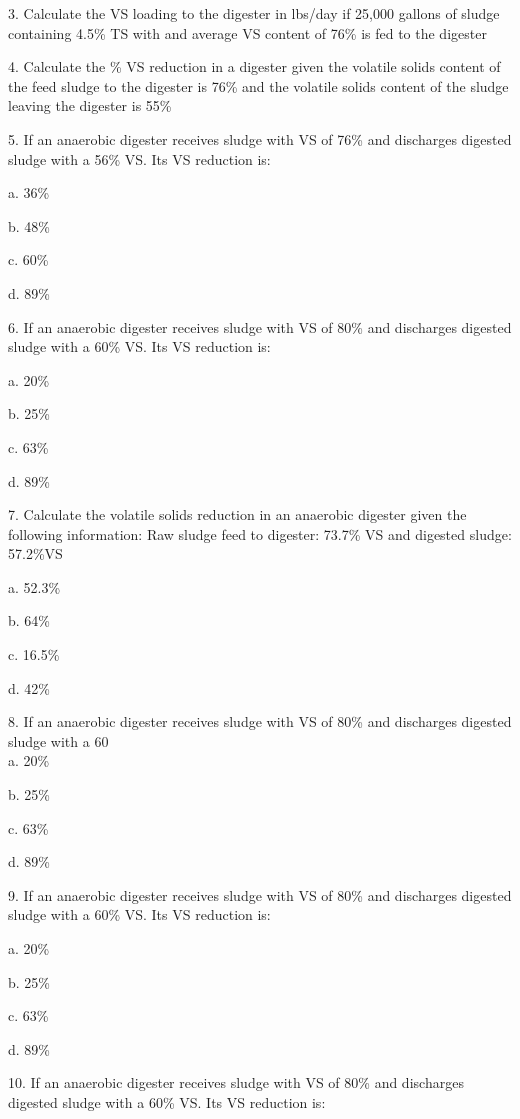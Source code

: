 \documentclass{article}
\begin{document}
3. Calculate the VS loading to the digester in lbs/day if 25,000 gallons of sludge containing 4.5\% TS with and average VS content of 76\% is fed to the digester 



4. Calculate the \% VS reduction in a digester given the volatile solids content of the feed sludge to the digester is 76\% and the volatile solids content of the sludge leaving the digester is 55\% 



5. If an anaerobic digester receives sludge with VS of 76\% and discharges digested sludge with a 56\% VS. Its VS reduction is:

a. 36\% 

b. 48\% 

c. 60\% 

d. 89\% 


6. If an anaerobic digester receives sludge with VS of 80\% and discharges digested sludge with a 60\% VS. Its VS reduction is:

a. 20\% 

b. 25\% 

c. 63\% 

d. 89\% 


7. Calculate the volatile solids reduction in an anaerobic digester given the following information: Raw sludge feed to digester: 73.7\% VS and digested sludge: 57.2\%VS

a. 52.3\% 

b. 64\% 

c. 16.5\% 

d. 42\% 


8. If an anaerobic digester receives sludge with VS of 80\% and discharges digested sludge with a 60\\%

a. 20\% 

b. 25\% 

c. 63\% 

d. 89\% 


9. If an anaerobic digester receives sludge with VS of 80\% and discharges digested sludge with a 60\% VS. Its VS reduction is:

a. 20\% 

b. 25\% 

c. 63\% 

d. 89\% 


10. If an anaerobic digester receives sludge with VS of 80\% and discharges digested sludge with a 60\% VS. Its VS reduction is:
\end{document}
